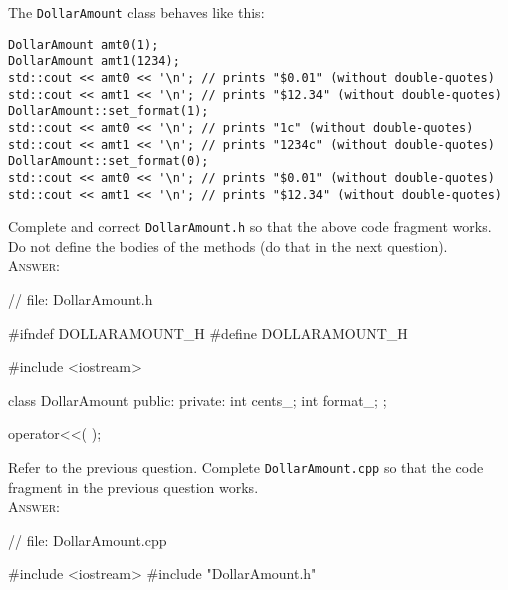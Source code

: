 \nextq
The \verb!DollarAmount! class behaves like this:
\begin{Verbatim}[frame=single,fontsize=\footnotesize]
DollarAmount amt0(1);
DollarAmount amt1(1234);
std::cout << amt0 << '\n'; // prints "$0.01" (without double-quotes)
std::cout << amt1 << '\n'; // prints "$12.34" (without double-quotes)
DollarAmount::set_format(1);
std::cout << amt0 << '\n'; // prints "1c" (without double-quotes)
std::cout << amt1 << '\n'; // prints "1234c" (without double-quotes)
DollarAmount::set_format(0);
std::cout << amt0 << '\n'; // prints "$0.01" (without double-quotes)
std::cout << amt1 << '\n'; // prints "$12.34" (without double-quotes)
\end{Verbatim}
Complete and correct \verb!DollarAmount.h! so that the
above code fragment works.
Do not define the bodies of the methods (do that in the next question).
\\
\textsc{Answer:}\vspace{-2mm}
\begin{answercode}
// file: DollarAmount.h

#ifndef DOLLARAMOUNT_H
#define DOLLARAMOUNT_H

#include <iostream>

class DollarAmount
{
public:
private:
    int cents_;
    int format_;
};

       operator<<(      );
\end{answercode}

\nextq
Refer to the previous question.
Complete \verb!DollarAmount.cpp! so that the code fragment in the previous
question works.
\\
\textsc{Answer:}\vspace{-2mm}
\begin{answercode}
// file: DollarAmount.cpp

#include <iostream>
#include "DollarAmount.h"


\end{answercode}

\newpage


